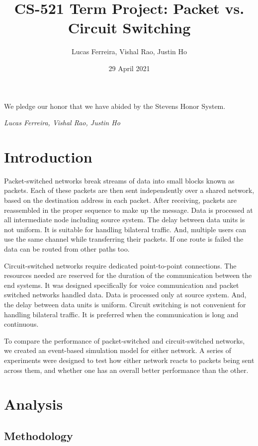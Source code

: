 \documentclass{article}
\title{CS-521 Term Project: Packet vs. Circuit Switching}
\author{Lucas Ferreira, Vishal Rao, Justin Ho}
\date{29 April 2021}
\begin{document}
  \maketitle

  {\flushleft We pledge our honor that we have abided by the Stevens Honor System.

  \textit{Lucas Ferreira, Vishal Rao, Justin Ho}}

  \section{Introduction}

  Packet-switched networks break streams of data into small blocks known as packets. Each of these packets are then sent
  independently over a shared network, based on the destination address in each packet. After receiving, packets are reassembled
  in the proper sequence to make up the message. Data is processed at all intermediate node including source system. The
  delay between data units is not uniform. It is suitable for handling bilateral traffic. And, multiple users can use the
  same channel while transferring their packets. If one route is failed the data can be routed from other paths too.

  Circuit-switched networks require dedicated point-to-point connections. The resources needed are reserved for the duration
  of the communication between the end systems. It was designed specifically for voice communication and packet switched
  networks handled data. Data is processed only at source system. And, the delay between data units is uniform. Circuit
  switching is not convenient for handling bilateral traffic. It is preferred when the communication is long and continuous.

  To compare the performance of packet-switched and circuit-switched networks, we created an event-based simulation model
  for either network. A series of experiments were designed to test how either network reacts to packets being sent across
  them, and whether one has an overall better performance than the other.


  \section{Analysis}

  \subsection{Methodology}
\end{document}
